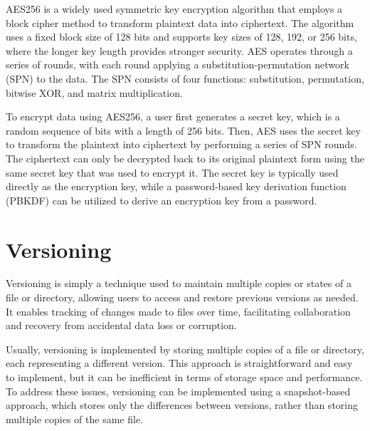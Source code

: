 AES256 is a widely used symmetric key encryption algorithm that employs a block cipher method to transform plaintext data into ciphertext.
The algorithm uses a fixed block size of 128 bits and supports key sizes of 128, 192, or 256 bits, where the longer key length provides stronger security.
AES operates through a series of rounds, with each round applying a substitution-permutation network (SPN) to the data.
The SPN consists of four functions: substitution, permutation, bitwise XOR, and matrix multiplication.

To encrypt data using AES256, a user first generates a secret key, which is a random sequence of bits with a length of 256 bits.
Then, AES uses the secret key to transform the plaintext into ciphertext by performing a series of SPN rounds.
The ciphertext can only be decrypted back to its original plaintext form using the same secret key that was used to encrypt it.
The secret key is typically used directly as the encryption key, while a password-based key derivation function (PBKDF) can be utilized to derive an encryption key from a password.

\section{Versioning}\label{sec:versioning}

Versioning is simply a technique used to maintain multiple copies or states of a file or directory, allowing users to access and restore previous versions as needed.
It enables tracking of changes made to files over time, facilitating collaboration and recovery from accidental data loss or corruption.

Usually, versioning is implemented by storing multiple copies of a file or directory, each representing a different version.
This approach is straightforward and easy to implement, but it can be inefficient in terms of storage space and performance.
To address these issues, versioning can be implemented using a snapshot-based approach, which stores only the differences between versions, rather than storing multiple copies of the same file.